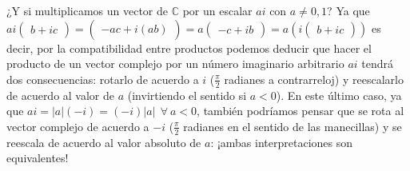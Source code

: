 \documentclass[notasLineal]{subfiles}
\begin{document}
   ¿Y si multiplicamos un vector de $\mathbb{C}$ por un escalar $ai$ con $a\neq 0,1$? Ya que $ai\begin{pmatrix}b + ic\end{pmatrix}=\begin{pmatrix}-ac+i(ab)\end{pmatrix}=a\begin{pmatrix}-c+ib\end{pmatrix}=a(i\begin{pmatrix}b+ic\end{pmatrix})$ \textemdash es decir, por la compatibilidad entre productos\textemdash\hspace{0.5mm} podemos deducir que hacer el producto de un vector complejo por un número imaginario arbitrario $ai$ tendrá dos consecuencias: rotarlo de acuerdo a $i$ ($\frac{\pi}{2}$ radianes a contrarreloj) y reescalarlo de acuerdo al valor de $a$ (invirtiendo el sentido si $a<0$). En este último caso, ya que $ai=|a|(-i)=(-i)|a| \ \ \forall \ a<0$, también podríamos pensar que se rota al vector complejo de acuerdo a $-i$ ($\frac{\pi}{2}$ radianes en el sentido de las manecillas) y se reescala de acuerdo al valor absoluto de $a$: ¡ambas interpretaciones son equivalentes! \\
\end{document}
